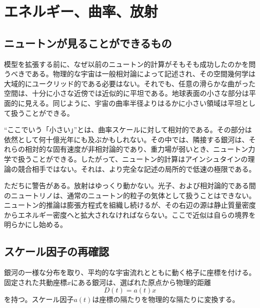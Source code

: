 \chapter{エネルギー、曲率、放射}


\section{ニュートンが見ることができるもの}

模型を拡張する前に、なぜ以前のニュートン的計算がそもそも成功したのかを問うべきである。物理的な宇宙は一般相対論によって記述され、その空間幾何学は大域的にユークリッド的である必要はない。それでも、任意の滑らかな曲がった空間は、十分に小さな近傍では近似的に平坦である。地球表面の小さな部分は平面的に見える。同じように、宇宙の曲率半径よりはるかに小さい領域は平坦として扱うことができる。

``ここでいう「小さい」''とは、曲率スケールに対して相対的である。その部分は依然として何十億光年にも及ぶかもしれない。その中では、隣接する銀河は、それらの相対的な固有速度が非相対論的であり、重力場が弱いとき、ニュートン力学で扱うことができる。したがって、ニュートン的計算はアインシュタインの理論の競合相手ではない。それは、より完全な記述の局所的で低速の極限である。

ただちに警告がある。放射はゆっくり動かない。光子、および相対論的である間のニュートリノは、通常のニュートン的粒子の気体として扱うことはできない。ニュートン的推論は膨張方程式を組織し続けるが、その右辺の源は静止質量密度からエネルギー密度へと拡大されなければならない。ここで近似は自らの境界を明らかにし始める。

\section{スケール因子の再確認}

銀河の一様な分布を取り、平均的な宇宙流れとともに動く格子に座標を付ける。固定された共動座標\(x\)にある銀河は、選ばれた原点から物理的距離
\begin{equation}
D(t)=a(t)x
\label{eq:c02-distance}
\end{equation}
を持つ。スケール因子\(a(t)\)は座標の隔たりを物理的な隔たりに変換する。

